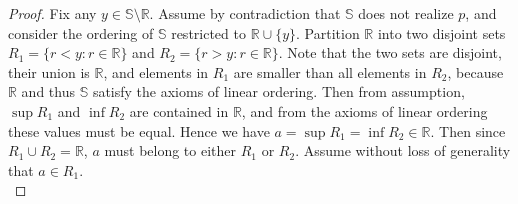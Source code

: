 \documentclass{article}
\begin{document}
\begin{enumerate}[label={\bf Q\arabic*:}]
\begin{proof}




      Fix any $y\in\mathbb{S}\setminus\mathbb{R}$. Assume by contradiction
      that $\mathbb{S}$ does not realize $p$, and consider the ordering of
      $\mathbb{S}$ restricted to $\mathbb{R}\cup\{y\}$. Partition
      $\mathbb{R}$ into two disjoint sets $R_1=\{r<y:r\in\mathbb{R}\}$ and
      $R_2=\{r>y:r\in\mathbb{R}\}$. Note that the two sets are disjoint,
      their union is $\mathbb{R}$, and elements in $R_1$ are smaller than
      all elements in $R_2$, because $\mathbb{R}$ and thus $\mathbb{S}$
      satisfy the axioms of linear ordering. Then from assumption,
      $\sup{R_1}$ and $\inf{R_2}$ are contained in $\mathbb{R}$, and from
      the axioms of linear ordering these values must be equal. Hence we
      have $a=\sup{R_1}=\inf{R_2}\in\mathbb{R}$. Then since $R_1\cup
      R_2=\mathbb{R}$, $a$ must belong to either $R_1$ or $R_2$. Assume
      without loss of generality that $a\in R_1$. \\


\end{proof}
\end{enumerate}
\end{document}
